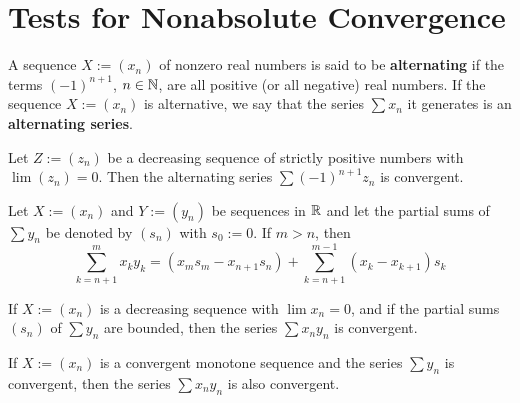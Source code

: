 \section{Tests for Nonabsolute Convergence}

\begin{definition}
	A sequence $X:=(x_n)$ of nonzero real numbers is said to be \textbf{alternating} if the terms $(-1)^{n+1}$, $n \in \mathbb{N}$, are all positive (or all negative) real numbers. If the sequence $X:=(x_n)$ is alternative, we say that the series $\sum x_n$ it generates is an \textbf{alternating series}.
\end{definition}

\begin{theorem}
	Let $Z:=(z_n)$ be a decreasing sequence of strictly positive numbers with $\lim (z_n)=0$. Then the alternating series $\sum (-1)^{n+1} z_n$ is convergent.
\end{theorem}

\begin{lemma}
	Let $X:=(x_n)$ and $Y:=(y_n)$ be sequences in $\mathbb{R}$ and let the partial sums of $\sum y_n$ be denoted by $(s_n)$ with $s_0:=0$. If $m >n$, then
	\[\sum\limits_{k=n+1}^{m}x_ky_k=(x_ms_m-x_{n+1}s_n)+\sum\limits_{k=n+1}^{m-1}(x_k-x_{k+1})s_k\]
\end{lemma}

\begin{theorem}
	If $X:=(x_n)$ is a decreasing sequence with $\lim x_n=0$, and if the partial sums $(s_n)$ of $\sum y_n$ are bounded, then the series $\sum x_ny_n$ is convergent.
\end{theorem}

\begin{theorem}
	If $X:=(x_n)$ is a convergent monotone sequence and the series $\sum y_n$ is convergent, then the series $\sum x_ny_n$ is also convergent.
\end{theorem}
